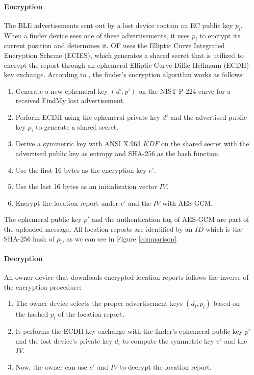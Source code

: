 \documentclass[english]{article}
\begin{document}
\paragraph{Encryption}
The BLE advertisements sent out by a lost device contain an EC public key $p_i$. 
When a finder device sees one of these advertisements, it uses $p_i$ to encrypt its current position and determines it. OF uses the Elliptic Curve Integrated Encryption Scheme (ECIES), which generates a shared secret that is utilized to encrypt the report through an ephemeral Elliptic Curve Diffie-Hellmann (ECDH) key exchange. According to \cite{whocanfind}, the finder’s encryption algorithm works as follows:
\begin{enumerate}
  \item Generate a new ephemeral key $(d', p')$ on the NIST P-224 curve for a received FindMy lost advertisement.
  \item Perform ECDH using the ephemeral private key $d'$ and the advertised public key $p_i$ to generate a shared secret.
  \item Derive a symmetric key with ANSI X.963 $KDF$ on the shared secret with the advertised public key as entropy and SHA-256 as the hash function.
  \item Use the first 16 bytes as the encryption key $e'$.
  \item Use the last 16 bytes as an initialization vector $IV$.
  \item Encrypt the location report under $e'$ and the $IV$ with AES-GCM. 
\end{enumerate} 
The ephemeral public key $p'$ and the authentication tag of AES-GCM are part of the uploaded message. All location reports are identified by an $ID$ which is the SHA-256 hash of $p_i$, as we can see in Figure \ref{comparison}.

\paragraph{Decryption}
An owner device that downloads encrypted location reports follows the inverse of the encryption procedure:
\begin{enumerate}
  \item The owner device selects the proper advertisement keys $(d_i, p_i)$ based on the hashed $p_i$ of the location report.
  \item It performs the ECDH key exchange with the finder’s ephemeral public key $p'$ and the lost device’s private key $d_i$ to compute the symmetric key $e'$ and the $IV$.
  \item Now, the owner can use $e'$ and $IV$ to decrypt the location report.
\end{enumerate}
\end{document}
